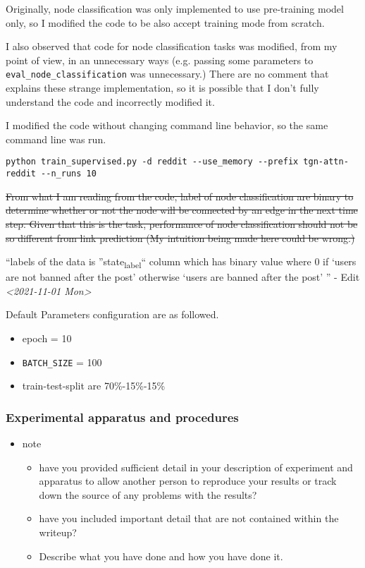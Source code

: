 \documentclass[11pt]{article}
\begin{document}
Originally, node classification was only implemented to use pre-training model only, so I modified the code to be also accept training mode from scratch.

I also observed that code for node classification tasks was modified, from my point of view, in an unnecessary ways (e.g. passing some parameters to \texttt{eval\_node\_classification} was unnecessary.)
There are no comment that explains these strange implementation, so it is possible that I don't fully understand the code and incorrectly modified it.

I modified the code without changing command line behavior, so the same command line was run.
\begin{verbatim}
python train_supervised.py -d reddit --use_memory --prefix tgn-attn-reddit --n_runs 10
\end{verbatim}

\sout{From what I am reading from the code, label of node classification are binary to determine whether or not the node will be connected by an edge in the next time step. Given that this is the task, performance of node classification should not be so different from link prediction (My intuition being made here could be wrong.)}

``labels of the data is ''state\textsubscript{label}`` column which has binary value where 0 if `users are not banned after the post' otherwise `users are banned after the post' '' - Edit \textit{<2021-11-01 Mon>}

Default Parameters configuration are as followed.

\begin{itemize}
\item epoch = 10
\item \texttt{BATCH\_SIZE} = 100
\item train-test-split are 70\%-15\%-15\%
\end{itemize}


\subsubsection{Experimental apparatus and procedures}
\label{sec:org07a06f8}
\begin{itemize}
\item note
\begin{itemize}
\item have you provided sufficient detail in your description of experiment and apparatus to allow another person to reproduce your results or track down the source of any problems with the results?
\item have you included important detail that are not contained within the writeup?
\item Describe what you have done and how you have done it.
\end{itemize}
\end{itemize}
\end{document}
